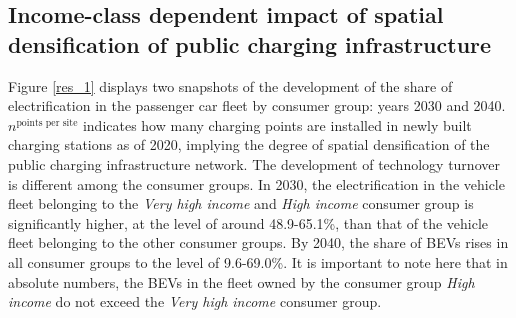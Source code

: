 \documentclass[preprint,review,11pt, authoryear]{elsarticle}
\begin{document}
    
    \subsection{Income-class dependent impact of spatial densification of public charging infrastructure} \label{sec:res_1_ic}
        Figure \ref{res_1} displays two snapshots of the development of the share of electrification in the passenger car fleet by consumer group: years 2030 and 2040. $n^{\textrm{points per site}}$ indicates how many charging points are installed in newly built charging stations as of 2020, implying the degree of spatial densification of the public charging infrastructure network. The development of technology turnover is different among the consumer groups. In 2030, the electrification in the vehicle fleet belonging to the \textit{Very high income} and \textit{High income} consumer group is significantly higher, at the level of around 48.9-65.1\%, than that of the vehicle fleet belonging to the other consumer groups. By 2040, the share of BEVs rises in all consumer groups to the level of 9.6-69.0\%. It is important to note here that in absolute numbers, the BEVs in the fleet owned by the consumer group \textit{High income} do not exceed the \textit{Very high income} consumer group.
            
\end{document}
